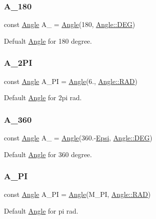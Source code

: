\subsubsection{\texorpdfstring{A\_180}{A\_180}}
{\footnotesize\ttfamily const \mbox{\hyperlink{class_angle}{Angle}} A\+\_ = \mbox{\hyperlink{class_angle}{Angle}}(180, \mbox{\hyperlink{class_angle_a4f7b9849ce8780bcba95ca3ee45cff77a65e2aa4bc05730c9c2e8fdaf73612282}{Angle\+::\+D\+EG}})}



Defualt \mbox{\hyperlink{class_angle}{Angle}} for 180 degree. 

\mbox{\label{maths_8hh_aa20a472b33e6aab45228fe60a82ffedb}} 
\subsubsection{\texorpdfstring{A\_2PI}{A\_2PI}}
{\footnotesize\ttfamily const \mbox{\hyperlink{class_angle}{Angle}} A\+\_\+PI = \mbox{\hyperlink{class_angle}{Angle}}(6., \mbox{\hyperlink{class_angle_a4f7b9849ce8780bcba95ca3ee45cff77a93ab6b68075fd7a6fe724fbde5b13c1f}{Angle\+::\+R\+AD}})}



Default \mbox{\hyperlink{class_angle}{Angle}} for 2pi rad. 

\mbox{\label{maths_8hh_a384a4f113909fe28d36a0393c7abaff6}} 
\subsubsection{\texorpdfstring{A\_360}{A\_360}}
{\footnotesize\ttfamily const \mbox{\hyperlink{class_angle}{Angle}} A\+\_ = \mbox{\hyperlink{class_angle}{Angle}}(360.-\/\mbox{\hyperlink{maths_8hh_a78802b279ab85021d7f6bffe51621703}{Epsi}}, \mbox{\hyperlink{class_angle_a4f7b9849ce8780bcba95ca3ee45cff77a65e2aa4bc05730c9c2e8fdaf73612282}{Angle\+::\+D\+EG}})}



Default \mbox{\hyperlink{class_angle}{Angle}} for 360 degree. 

\mbox{\label{maths_8hh_a34beede535fdcd8e9e75481293dbdc3c}} 
\subsubsection{\texorpdfstring{A\_PI}{A\_PI}}
{\footnotesize\ttfamily const \mbox{\hyperlink{class_angle}{Angle}} A\+\_\+\+PI = \mbox{\hyperlink{class_angle}{Angle}}(M\+\_\+\+PI, \mbox{\hyperlink{class_angle_a4f7b9849ce8780bcba95ca3ee45cff77a93ab6b68075fd7a6fe724fbde5b13c1f}{Angle\+::\+R\+AD}})}



Default \mbox{\hyperlink{class_angle}{Angle}} for pi rad. 

